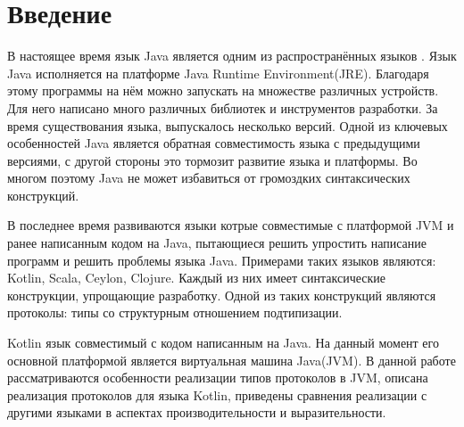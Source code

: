 \section*{Введение}

В настоящее время язык Java является одним из распространённых языков \cite{tiobe}. Язык Java исполняется на платформе Java Runtime Environment(JRE). Благодаря этому программы на нём можно запускать на множестве различных устройств. Для него написано много различных библиотек и инструментов разработки. За время существования языка, выпускалось несколько версий. Одной из ключевых особенностей Java является обратная совместимость языка с предыдущими версиями\cite{openjdk:compatibility}, с другой стороны это тормозит развитие языка и платформы. Во многом поэтому Java не может избавиться от громоздких синтаксических конструкций.

В последнее время развиваются языки котрые совместимые с платформой JVM и ранее написанным кодом на Java, пытающиеся решить упростить написание программ и решить проблемы языка Java. Примерами таких языков являются: Kotlin, Scala, Ceylon, Clojure. Каждый из них имеет синтаксические конструкции, упрощающие разработку. Одной из таких конструкций являются протоколы: типы со структурным отношением подтипизации.

Kotlin язык совместимый с кодом написанным на Java. На данный момент его основной платформой является виртуальная машина Java(JVM). В данной работе рассматриваются особенности реализации типов протоколов в JVM, описана реализация протоколов для языка Kotlin, приведены сравнения реализации с другими языками в аспектах производительности и выразительности.

%



